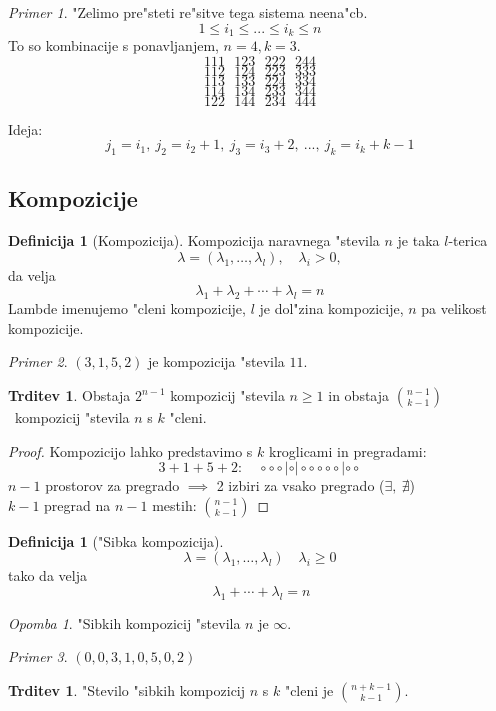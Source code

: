 \documentclass[a4paper,12pt]{article}
\theoremstyle{definition}
\newtheorem{defn}[counter]{Definicija}
\newtheorem{claim}[counter]{Trditev}
\theoremstyle{remark}
\newtheorem*{ex}{Primer}
\newtheorem*{rem}{Opomba}
\begin{document}
\label{TODO: what is this??}
\begin{ex}
	"Zelimo pre"steti re"sitve tega sistema neena"cb.
	\[1 \leqslant i_1 \leqslant ... \leqslant i_k \leqslant n\]
	To so kombinacije s ponavljanjem, $n=4, k=3$.
	\[1 1 1 \ \ \ 1 2 3 \ \ \ 2 2 2 \ \ \ 2 4 4\]
	\[1 1 2 \ \ \ 1 2 4 \ \ \ 2 2 3 \ \ \ 3 3 3\]
	\[1 1 3 \ \ \ 1 3 3 \ \ \ 2 2 4 \ \ \ 3 3 4\]
	\[1 1 4 \ \ \ 1 3 4 \ \ \ 2 3 3 \ \ \ 3 4 4\]
	\[1 2 2 \ \ \ 1 4 4 \ \ \ 2 3 4 \ \ \ 4 4 4\]

	Ideja:
	\[j_1 = i_1, \ j_2 = i_2 + 1, \ j_3 = i_3 + 2, \ ..., \ j_k = i_k + k - 1 \]
\end{ex}

\subsection{Kompozicije}
\begin{defn}[Kompozicija]
	Kompozicija naravnega "stevila $n$ je taka $l$-terica
	\[ \lambda = (\lambda_1, \ldots, \lambda_l), \quad \lambda_i > 0,\]
	da velja
	\[\lambda_1 + \lambda_2 + \cdots + \lambda_l = n\]
	Lambde imenujemo "cleni kompozicije, $l$ je dol"zina kompozicije, $n$ pa velikost kompozicije.
\end{defn}
\begin{ex}
	$(3, 1, 5, 2)$ je kompozicija "stevila $11$.
\end{ex}


\begin{claim}
	Obstaja $2^{n-1}$ kompozicij "stevila $n \geqslant 1$ in obstaja $\binom{n - 1}{k - 1}$~kompozicij "stevila $n$ s $k$ "cleni.
\end{claim}

\begin{proof}
	Kompozicijo lahko predstavimo s $k$ kroglicami in pregradami:
	\[
		3 + 1 + 5 + 2: \quad
		\circ \circ \circ|\circ|\circ \circ \circ \circ \circ |\circ \circ
	\]
	$n - 1$ prostorov za pregrado $\implies$ 2 izbiri za vsako pregrado ($\exists, \ \nexists$)\\
	$k - 1$ pregrad na $n - 1$ mestih: $\binom{n - 1}{k - 1}$
\end{proof}

\begin{defn}["Sibka kompozicija]
	\[ \lambda = (\lambda_1, \ldots, \lambda_l) \quad \lambda_i \geqslant 0\]
	tako da velja
	\[ \ \lambda_1 + \cdots + \lambda_l = n\]
\end{defn}
\begin{rem}
	"Sibkih kompozicij "stevila $n$ je $\infty$.
\end{rem}
\begin{ex}
	$(0, 0, 3, 1, 0, 5, 0, 2)$
\end{ex}
\begin{claim}
	"Stevilo "sibkih kompozicij $n$ s $k$ "cleni je $\binom{n + k-1}{k - 1}$.
\end{claim}
\end{document}
